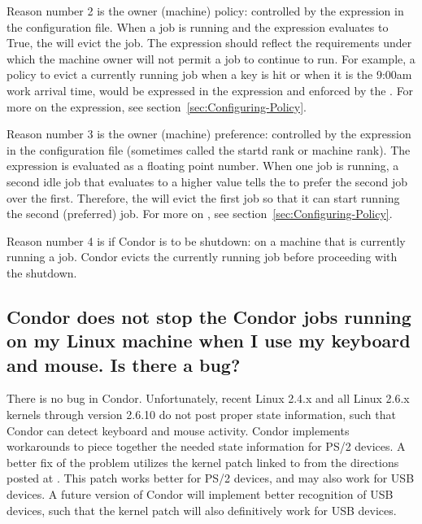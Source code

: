 Reason number 2 is the owner (machine) policy:
controlled by the  expression in the configuration file.
When a job is running and the  expression
evaluates to True,
the  will evict the job.
The  expression should reflect 
the requirements under which the machine owner will not permit
a job to continue to run.
For example, a policy to evict a currently running job when a key is hit
or when it is the 9:00am work arrival time,
would be expressed in the  expression 
and enforced by the .
For more on the  expression,
see section~\ref{sec:Configuring-Policy}.

Reason number 3 is the owner (machine) preference:
controlled by the  expression in the 
configuration file (sometimes called the startd rank or machine rank).
The  expression is evaluated as a floating point number.
When one job is running, a second idle job that evaluates to a higher
 value 
tells the  to prefer the second job over the first.
Therefore, the  will evict the first 
job so that it can start running the second (preferred) job.
For more on ,
see section~\ref{sec:Configuring-Policy}.

Reason number 4 is if Condor is to be shutdown:
on a machine that is currently running a job.
Condor evicts the currently running job before proceeding
with the shutdown.

\subsection*{Condor does not stop the Condor jobs running on my Linux machine
when I use my keyboard and mouse.  Is there a bug?}

There is no bug in Condor.
Unfortunately,
recent Linux 2.4.x and all Linux 2.6.x kernels through 
version 2.6.10
do not post proper state information,
such that Condor can detect keyboard and mouse activity.
Condor 
implements workarounds to piece together the needed
state information for PS/2 devices.
A better fix of the problem utilizes the 
kernel patch linked to from the directions posted at
.
This patch works better for PS/2 devices, and
may also work for USB devices.
A future version of Condor will implement better recognition
of USB devices,
such that the kernel patch will also definitively work for USB devices.


